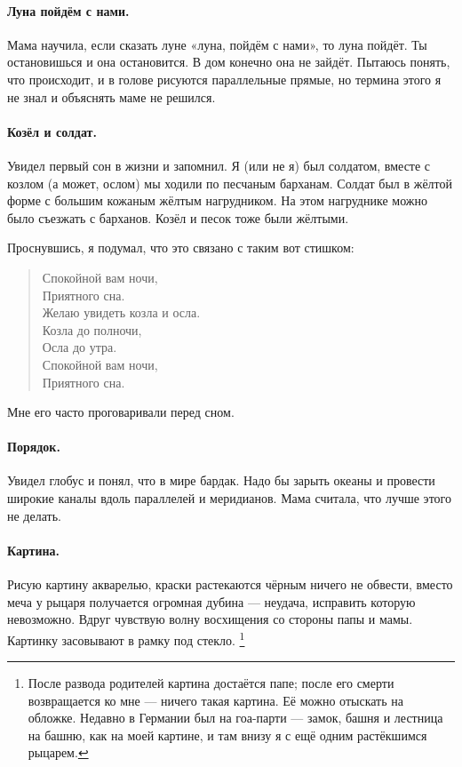 \documentclass{book}
\begin{document}
\paragraph{Луна пойдём с нами.}
Мама научила, если сказать луне «луна, пойдём с нами», то луна пойдёт.
Ты остановишься и она остановится.
В дом конечно она не зайдёт.
Пытаюсь понять, что происходит, и в голове рисуются параллельные прямые, но термина этого я не знал и объяснять маме не решился.

\paragraph{Козёл  и солдат.}
Увидел первый сон в жизни и запомнил.
Я (или не я) был солдатом, вместе с козлом (а может, ослом) мы ходили по песчаным барханам.
Солдат был в жёлтой форме с большим кожаным жёлтым нагрудником.
На этом нагруднике можно было съезжать с барханов.
Козёл и песок тоже были жёлтыми.

Проснувшись, я подумал, что это связано с таким вот стишком:
\begin{verse}
Спокойной вам ночи,\\
Приятного сна.\\
Желаю увидеть козла и осла.\\
Козла до полночи,\\
Осла до утра.\\
Спокойной вам ночи,\\
Приятного сна.
\end{verse}
Мне его часто проговаривали перед сном.

\paragraph{Порядок.}
Увидел глобус и понял, что в мире бардак.
Надо бы зарыть океаны и провести широкие каналы вдоль параллелей и меридианов.
Мама считала, что лучше этого не делать.

\paragraph{Картина.}
Рисую картину акварелью, 
краски растекаются чёрным ничего не обвести,
вместо меча у рыцаря получается огромная дубина ---
неудача, исправить которую невозможно.
Вдруг чувствую волну восхищения со стороны папы и мамы.
Картинку засовывают в рамку под стекло.%
\footnote{После развода родителей картина достаётся папе;
после его смерти возвращается ко мне --- ничего такая картина.
Её можно отыскать на обложке.
Недавно в Германии был на гоа-парти --- замок, башня и лестница на башню, как на моей картине,
и там внизу я с ещё одним растёкшимся рыцарем.}
\end{document}
